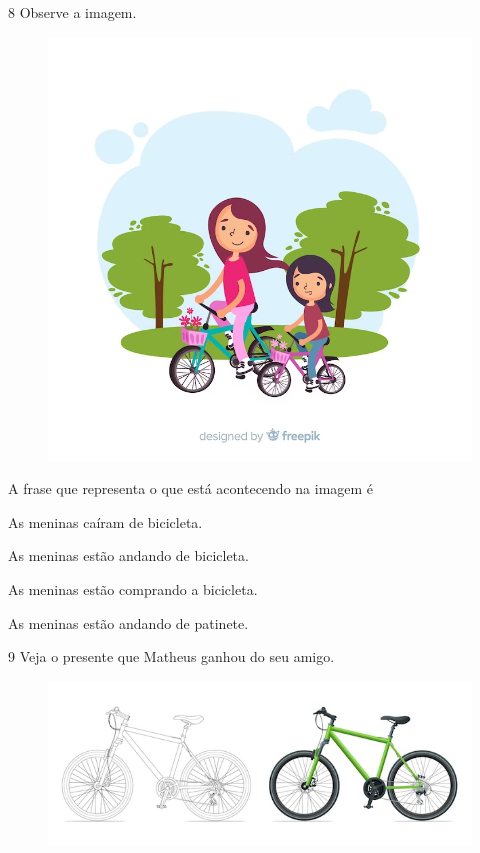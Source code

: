 \num{8} Observe a imagem.

\begin{figure}[htpb!]
\centering
\includegraphics[width=.65\textwidth]{media/image179.png}
\end{figure}


\pagebreak
A frase que representa o que está acontecendo na imagem é

\begin{escolha}
\item As meninas caíram de bicicleta.

\item As meninas estão andando de bicicleta.

\item As meninas estão comprando a bicicleta.

\item As meninas estão andando de patinete.
\end{escolha}


\num{9} Veja o presente que Matheus ganhou do seu amigo.

\begin{figure}[htpb!]
\centering
\includegraphics[width=.8\textwidth]{media/image180.jpeg}
\end{figure}

